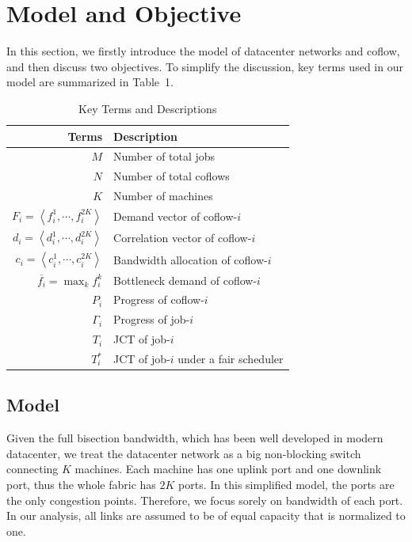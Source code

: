 \documentclass[10pt,journal,compsoc]{IEEEtran}
\begin{document}
\section{Model and Objective}\label{model}
In this section, we firstly introduce the model of datacenter networks and coflow, and then discuss two objectives.
%
To simplify the discussion, key terms used in our model are summarized in Table~1.

\begin{table}
\caption{Key Terms and Descriptions}
\begin{center}
\begin{tabular}{|r|l|}
\hline
Terms & Description\\
\hline
$M$ & Number of total jobs\\
\hline
$N$ & Number of total coflows\\
\hline
$K$ & Number of machines\\
\hline
$F_i = \left\langle f_i^1,\cdots,f_i^{2K}\right\rangle$ & Demand vector of coflow-$i$\\
\hline
$d_i = \left\langle d_i^1,\cdots,d_i^{2K}\right\rangle$ & Correlation vector of coflow-$i$\\
\hline
$c_i=\left\langle c_i^1,\cdots,c_i^{2K}\right\rangle$ & Bandwidth allocation of coflow-$i$\\
\hline
$\overline{f_i}=\max_{k} f_i^k$ & Bottleneck demand of coflow-$i$\\
\hline
$P_i$ & Progress of coflow-$i$\\
\hline
$\Gamma_i$ & Progress of job-$i$\\
\hline
$T_i$ & JCT of job-$i$\\
\hline
$T_i^*$ & JCT of job-$i$ under a fair scheduler\\
\hline
\end{tabular}
\end{center}
\end{table}

\subsection{Model}
Given the full bisection bandwidth, which has been well developed in modern datacenter\cite{jupiter}, we treat the datacenter network as a big non-blocking switch connecting $K$ machines.
%
Each machine has one uplink port and one downlink port, thus the whole fabric has $2K$ ports.
%
In this simplified model, the ports are the only congestion points.
%
Therefore, we focus sorely on bandwidth of each port.
%
In our analysis, all links are assumed to be of equal capacity that is normalized to one.
\end{document}
